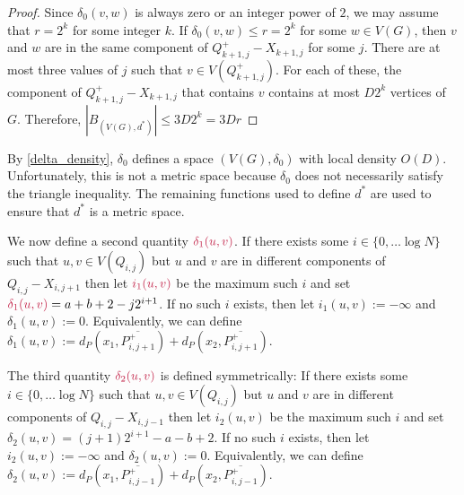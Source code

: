 \documentclass{patmorin}
\makeatletter
\renewcommand{\ge}{\geqslant}
\renewcommand{\le}{\leqslant}
\newcommand{\pat}[1]{\textcolor{Blue}{Pat: #1}}
\newcommand{\gwen}[1]{\textcolor{Purple}{Gwen: #1}}
\def\mathcolor#1#{\@mathcolor{#1}}
\def\@mathcolor#1#2#3{%
  \protect\leavevmode
  \begingroup
    \color#1{#2}#3%
  \endgroup
}
\newcommand{\mathdefin}[1]{\mathcolor{brightmaroon}{#1}}
\makeatother
\begin{document}
\begin{proof}
  Since $\delta_0(v,w)$ is always zero or an integer power of $2$, we may assume that $r=2^k$ for some integer $k$.  If $\delta_0(v,w)\le r=2^k$ for some $w\in V(G)$, then $v$ and $w$ are in the same component of $Q^+_{k+1,j}-X_{k+1,j}$ for some $j$.
  There are at most three values of $j$ such that $v\in V(Q^+_{k+1,j})$.  For each of these, the component of $Q^+_{k+1,j}-X_{k+1,j}$ that contains $v$ contains at most $D2^{k}$ vertices of $G$. Therefore, $|B_{(V(G),d^*)}| \le 3D 2^{k}= 3Dr$
\end{proof}

By \cref{delta_density}, $\delta_0$ defines a space $(V(G),\delta_0)$ with local density $O(D)$.  Unfortunately, this is not a metric space because $\delta_0$ does not necessarily satisfy the triangle inequality.  The remaining functions used to define $d^*$ are used to ensure that $d^*$ is a metric space.

We now define a second quantity $\mathdefin{\delta_1(u,v)}$.  If there exists some $i\in\{0,\ldots\log N\}$ such that $u,v\in V(Q_{i,j})$ but $u$ and $v$ are in different components of $Q_{i,j}-X_{i,j+1}$ then let $\mathdefin{i_1(u,v)}$ be the maximum such $i$ and set $\mathdefin{\delta_1(u,v)}=a+b+2-j2^{i+1}$. If no such $i$ exists, then let $i_1(u,v):=-\infty$ and $\delta_1(u,v):=0$.
Equivalently, we can define $\delta_1(u,v):=d_{P}(x_1,\overline{P^+_{i,j+1}})+d_{P}(x_2,\overline{P^+_{i,j+1}})$.

The third quantity $\mathdefin{\delta_2(u,v)}$ is defined symmetrically: If there exists some $i\in\{0,\ldots\log N\}$ such that $u,v\in V(Q_{i,j})$ but $u$ and $v$ are in different components of $Q_{i,j}-X_{i,j-1}$ then let $i_2(u,v)$ be the maximum such $i$ and set $\delta_2(u,v)=(j+1)2^{i+1}-a-b+2$. If no such $i$ exists, then let $i_2(u,v):=-\infty$ and $\delta_2(u,v):=0$.  Equivalently, we can define $\delta_2(u,v):=d_{P}(x_1,\overline{P^+_{i,j-1}})+d_{P}(x_2,\overline{P^+_{i,j-1}})$.
\end{document}

